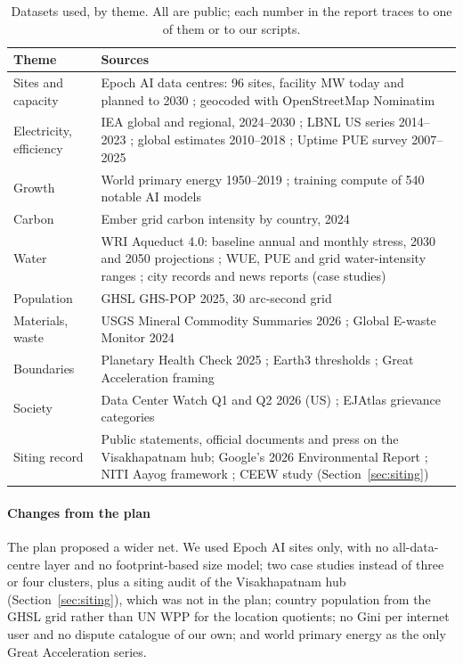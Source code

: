 \begin{table}[t]\centering
\caption{Datasets used, by theme. All are public; each number in the report traces to one of them or to our scripts.}
\label{tab:data}
\footnotesize\renewcommand{\arraystretch}{1.08}
\begin{tabular}{@{}P{1.75cm}P{5.85cm}@{}}
\toprule
Theme & Sources \\
\midrule
Sites and capacity & Epoch AI data centres: 96 sites, facility MW today and planned to 2030 \citep{epoch2026dc};
geocoded with OpenStreetMap Nominatim \citep{osm2026} \\
Electricity, efficiency & IEA global and regional, 2024--2030 \citep{iea2025}; LBNL US series 2014--2023
\citep{shehabi2024}; global estimates 2010--2018 \citep{masanet2020}; Uptime PUE survey 2007--2025
\citep{uptime2025} \\
Growth & World primary energy 1950--2019 \citep{owid2026energy}; training compute of 540 notable AI models
\citep{epoch2026models} \\
Carbon & Ember grid carbon intensity by country, 2024 \citep{ember2026} \\
Water & WRI Aqueduct 4.0: baseline annual and monthly stress, 2030 and 2050 projections \citep{kuzma2023}; WUE, PUE
and grid water-intensity ranges \citep{devriesgao2026}; city records and news reports (case studies) \\
Population & GHSL GHS-POP 2025, 30 arc-second grid \citep{schiavina2023} \\
Materials, waste & USGS Mineral Commodity Summaries 2026 \citep{usgs2026}; Global E-waste Monitor 2024
\citep{balde2024} \\
Boundaries & Planetary Health Check 2025 \citep{sakschewski2025}; Earth3 thresholds \citep{collste2018}; Great
Acceleration framing \citep{steffen2015ga} \\
Society & Data Center Watch Q1 and Q2 2026 (US) \citep{dcw2026,dcw2026q2}; EJAtlas grievance categories \citep{temper2015} \\
Siting record & Public statements, official documents and press on the Visakhapatnam hub; Google's 2026 Environmental Report
\citep{google2026env}; NITI Aayog framework \citep{niti2026}; CEEW study \citep{ceew2026} (Section~\ref{sec:siting}) \\
\bottomrule
\end{tabular}
\end{table}

\paragraph{Changes from the plan} The plan proposed a wider net. We used Epoch AI sites only, with no all-data-centre
layer and no footprint-based size model; two case studies instead of three or four clusters, plus a siting audit of the Visakhapatnam hub (Section~\ref{sec:siting}), which was not in the plan; country population from
the GHSL grid rather than UN WPP for the location quotients; no Gini per internet user and no dispute catalogue of our
own; and world primary energy as the only Great Acceleration series.

